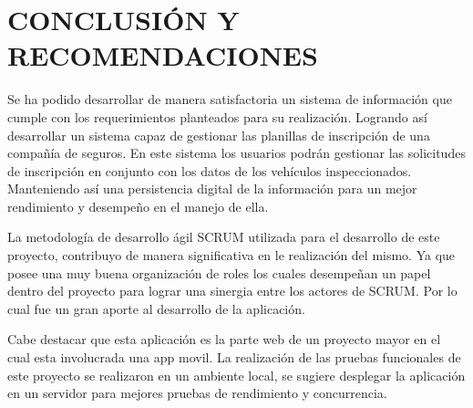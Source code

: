 \chapter*{CONCLUSIÓN Y RECOMENDACIONES }



\setlength{\parskip}{5mm}

Se ha podido desarrollar de manera satisfactoria un sistema de información que cumple con los requerimientos planteados para su realización. Logrando así desarrollar un sistema capaz de gestionar las planillas de inscripción de una compañía de seguros. En este sistema los usuarios podrán gestionar las solicitudes de inscripción en conjunto con los datos de los vehículos inspeccionados. Manteniendo así una persistencia digital de la información para un mejor rendimiento y desempeño en el manejo de ella.

La metodología de desarrollo ágil SCRUM utilizada para el desarrollo de este proyecto, contribuyo de manera significativa en le realización del mismo. Ya que posee una muy buena organización de roles los cuales desempeñan un papel dentro del proyecto para lograr una sinergia entre los actores de SCRUM. Por lo cual fue un gran aporte al desarrollo de la aplicación.


Cabe destacar que esta aplicación es la parte web de un proyecto mayor en el cual esta involucrada una app movil. La realización de las pruebas funcionales de este proyecto se realizaron en un ambiente local, se sugiere desplegar la aplicación en un servidor para mejores pruebas de rendimiento y concurrencia.







\setlength{\parskip}{0mm}